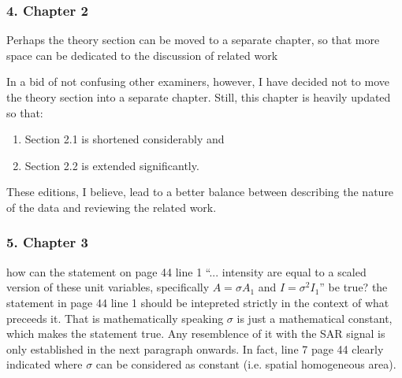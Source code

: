 \subsubsection*{4. Chapter 2}

\replyToComment
    {Perhaps the theory section can be moved to a separate chapter, so that more space can be dedicated to the discussion of related work}
    {In a bid of not confusing other examiners, however, I have decided not to move the theory section into a separate chapter.
Still, this chapter is heavily updated so that: 
\vspace{-3mm}
\begin{enumerate}
  \item Section 2.1 is shortened considerably and 
  \item Section 2.2 is extended significantly. 
\end{enumerate}
These editions, I believe, lead to a better balance between describing the nature of the data and reviewing the related work.
}

%

\subsubsection*{5. Chapter 3}

\replyToComment
    {how can the statement on page 44 line 1 ``... intensity are equal to a scaled version of these unit variables, specifically $A=\sigma A_1$ and $I=\sigma^2 I_1$'' be true?}
    {the statement in page 44 line 1 should be intepreted strictly in the context of what preceeds it. 
That is mathematically  speaking $\sigma$ is just a mathematical constant, which makes the statement true. 
Any resemblence of it with the SAR signal is only established in the next paragraph onwards.
In fact, line 7 page 44 clearly indicated where $\sigma$ can be considered as constant (i.e. spatial homogeneous area).
}

